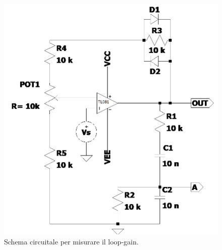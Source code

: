 \documentclass[10pt, a4paper, italian]{article}
\begin{document}
\begin{figure}[H]
    \centering
	\includegraphics[scale=0.5]{Draft1}
    \caption{Schema circuitale per misurare il loop-gain.
    \label{fig: Draft1}}
\end{figure}
\end{document}
